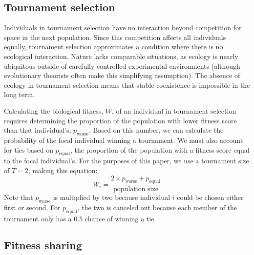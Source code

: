 \subsection{Tournament selection}
Individuals in tournament selection have no interaction beyond competition for space in the next population. Since this competition
affects all individuals equally, tournament selection approximates a condition where there is no ecological interaction. Nature lacks comparable situations, as ecology is nearly ubiquitous outside of carefully controlled experimental environments (although evolutionary theorists often make this simplifying assumption).
The absence of ecology in tournament selection means that stable coexistence is impossible in the long term. 

Calculating the biological fitness, $W$, of an individual in tournament selection requires determining the proportion of the population with lower fitness score than that individual's, $p_{\text{worse}}$. Based on this number, we can calculate the probability of the focal individual winning a tournament. We must also account for ties based on $p_{\text{equal}}$, the proportion of the population with a fitness score equal to the focal individual's. For the purposes of this paper, we use a tournament size of $T=2$, making this equation:
\begin{equation}
W_{i} = \frac{2\times p_{\text{worse}} + p_{\text{equal}}}{\text{population size}}
\label{tournament_equation}
\end{equation}
Note that $p_{\text{worse}}$ is multiplied by two because individual $i$ could be chosen either first or second. For $p_{\text{equal}}$, the two is canceled out because each member of the tournament only has a $0.5$ chance of winning a tie.

\subsection{Fitness sharing}

